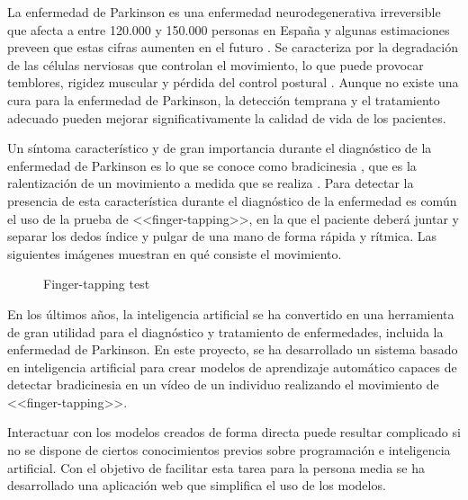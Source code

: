 \label{cha:Introducción}

La enfermedad de Parkinson es una enfermedad neurodegenerativa irreversible que
afecta a entre 120.000 y 150.000 personas en España \cite{santos2021present} y
algunas estimaciones preveen que estas cifras aumenten en el futuro
\cite{sen2021futuro}. Se caracteriza por la degradación de las células nerviosas
que controlan el movimiento, lo que puede provocar temblores, rigidez muscular y
pérdida del control postural \cite{eswiki:148845196}. Aunque no existe una cura
para la enfermedad de Parkinson, la detección temprana y el tratamiento adecuado
pueden mejorar significativamente la calidad de vida de los pacientes.

Un síntoma característico y de gran importancia durante el diagnóstico de la
enfermedad de Parkinson es lo que se conoce como bradicinesia
\cite{postuma2015mds}, que es la ralentización de un movimiento a medida que se
realiza \cite{berardelli2001pathophysiology}. Para detectar la presencia de esta
característica durante el diagnóstico de la enfermedad es común el uso de la
prueba de <<finger-tapping>>, en la que el paciente deberá juntar y separar los
dedos índice y pulgar de una mano de forma rápida y rítmica. Las siguientes
imágenes muestran en qué consiste el movimiento.

\begin{figure}[H]
    \centering
    \caption{Finger-tapping test}
\end{figure}

En los últimos años, la inteligencia artificial se ha convertido en una
herramienta de gran utilidad para el diagnóstico y tratamiento de enfermedades,
incluida la enfermedad de Parkinson. En este proyecto, se ha desarrollado un
sistema basado en inteligencia artificial para crear modelos de aprendizaje
automático capaces de detectar bradicinesia en un vídeo de un individuo
realizando el movimiento de <<finger-tapping>>.

Interactuar con los modelos creados de forma directa puede resultar complicado
si no se dispone de ciertos conocimientos previos sobre programación e
inteligencia artificial. Con el objetivo de facilitar esta tarea para la persona
media se ha desarrollado una aplicación web que simplifica el uso de los
modelos.

